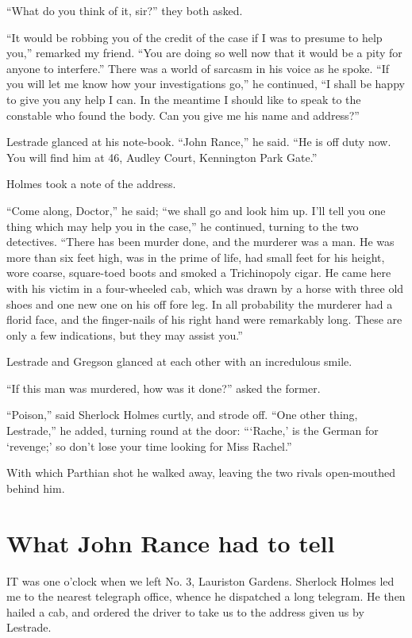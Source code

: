 \documentclass[12pt]{book}
\begin{document}
“What do you think of it, sir?” they both asked. 

“It would be robbing you of the credit of the case if I was to presume to help you,” remarked my friend. “You are doing so well now that it would be a pity for anyone to interfere.” There was a world of sarcasm in his voice as he spoke. “If you will let me know how your investigations go,” he continued, “I shall be happy to give you any help I can. In the meantime I should like to speak to the constable who found the body. Can you give me his name and address?” 

Lestrade glanced at his note-book. “John Rance,” he said. “He is off duty now. You will find him at 46, Audley Court, Kennington Park Gate.” 

Holmes took a note of the address. 

“Come along, Doctor,” he said; “we shall go and look him up. I’ll tell you one thing which may help you in the case,” he continued, turning to the two detectives. “There has been murder done, and the murderer was a man. He was more than six feet high, was in the prime of life, had small feet for his height, wore coarse, square-toed boots and smoked a Trichinopoly cigar. He came here with his victim in a four-wheeled cab, which was drawn by a horse with three old shoes and one new one on his off fore leg. In all probability the murderer had a florid face, and the finger-nails of his right hand were remarkably long. These are only a few indications, but they may assist you.” 

Lestrade and Gregson glanced at each other with an incredulous smile. 

“If this man was murdered, how was it done?” asked the former. 

“Poison,” said Sherlock Holmes curtly, and strode off. “One other thing, Lestrade,” he added, turning round at the door: “‘Rache,’ is the German for ‘revenge;’ so don’t lose your time looking for Miss Rachel.” 

With which Parthian shot he walked away, leaving the two rivals open-mouthed behind him. 







\chapter{What John Rance had to tell} 

IT was one o’clock when we left No. 3, Lauriston Gardens. Sherlock Holmes led me to the nearest telegraph office, whence he dispatched a long telegram. He then hailed a cab, and ordered the driver to take us to the address given us by Lestrade. 
\end{document}
